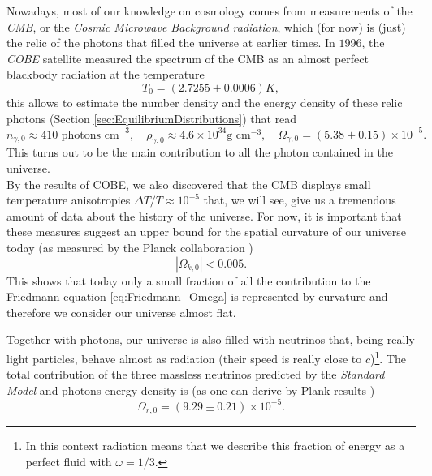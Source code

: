 Nowadays, most of our knowledge on cosmology comes from measurements of the \emph{CMB}, or the \emph{Cosmic Microwave Background radiation}, which (for now) is (just) the relic of the photons that filled the universe at earlier times. In $1996$, the \emph{COBE} satellite \cite{COBE1996} measured the spectrum of the CMB as an almost perfect blackbody radiation at the temperature 
\begin{equation}
    \label{eq:T0_CMB}
    T_0=(2.7255\pm0.0006)K,
\end{equation}
this allows to estimate the number density and the energy density of these relic photons (Section \ref{sec:EquilibriumDistributions}) that read
\begin{equation}
    n_{\gamma,0}\approx410\text{ photons cm}^{-3},\quad \rho_{\gamma, 0}\approx4.6\times10^{34}\text{g cm}^{-3},\quad\Omega_{\gamma,0}=(5.38\pm0.15)\times10^{-5}.
\end{equation}
This turns out to be the main contribution to all the photon contained in the universe.\\
By the results of COBE, we also discovered that the CMB displays small temperature anisotropies $\Delta T/T\approx 10^{-5}$ that, we will see, give us a tremendous amount of data about the history of the universe. For now, it is important that these measures suggest an upper bound for the spatial curvature of our universe today (as measured by the Planck collaboration \cite{planck2018results})
\begin{equation}
    \label{eq:Omega_k0}|\Omega_{k,0}|<0.005.
\end{equation}
This shows that today only a small fraction of all the contribution to the Friedmann equation \eqref{eq:Friedmann_Omega} is represented by curvature and therefore we consider our universe almost flat. 

Together with photons, our universe is also filled with neutrinos that, being really light particles, behave almost as radiation (their speed is really close to $c$)\footnote{In this context radiation means that we describe this fraction of energy as a perfect fluid with $\omega=1/3$.}. The total contribution of the three massless neutrinos predicted by the \emph{Standard Model} and photons energy density is (as one can derive by Plank results \cite{planck2018results})  
\begin{equation}
    \Omega_{r,0}=(9.29\pm0.21)\times10^{-5}.
\end{equation}

